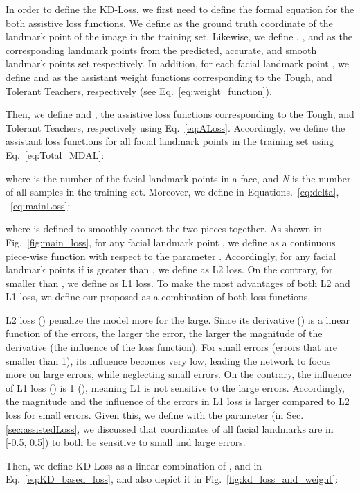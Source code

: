 \documentclass[times,twocolumn,final,authoryear]{elsarticle}
\begin{document}
In order to define the KD-Loss, we first need to define the formal equation for the both assistive loss functions. We define  as the ground truth coordinate of the  landmark point of the  image in the training set. Likewise, we define , , and  as the corresponding landmark points from the predicted, accurate, and smooth landmark points set respectively. In addition, for each facial landmark point , we define  and  as the assistant weight functions corresponding to the Tough, and Tolerant Teachers, respectively (see Eq.~\ref{eq:weight_function}).

Then, we define  and , the assistive loss functions corresponding to the Tough, and Tolerant Teachers, respectively using Eq.~\ref{eq:ALoss}. Accordingly, we define the assistant loss functions for all facial landmark points in the training set using Eq.~\ref{eq:Total_MDAL}:

where  is the number of the facial landmark points in a face, and \textit{N} is the number of all samples in the training set. Moreover, we define  in Equations.~\ref{eq:delta}, ~\ref{eq:mainLoss}:



where  is defined to smoothly connect the two pieces together. As shown in Fig.~\ref{fig:main_loss}, for any facial landmark point , we define  as a continuous piece-wise function with respect to the parameter . Accordingly, for any facial landmark points if  is greater than , we define  as L2 loss. On the contrary, for  smaller than , we define  as L1 loss. To make the most advantages of both L2 and L1 loss, we define our proposed  as a combination of both loss functions.

L2 loss () penalize the model more for the large. Since its derivative () is a linear function of the errors, the larger the error, the larger the magnitude of the derivative (the influence of the loss function). For small errors (errors that are smaller than 1), its influence becomes very low, leading the network to focus more on large errors, while neglecting small errors.
On the contrary, the influence of L1 loss () is 1 (), meaning L1 is not sensitive to the large errors. Accordingly, the magnitude and the influence of the errors in L1 loss is larger compared to L2 loss for small errors. Given this, we define  with the parameter  (in Sec.\ref{sec:assistedLoss}, we discussed that coordinates of all facial landmarks are in [-0.5, 0.5]) to both be sensitive to small and large errors.

Then, we define KD-Loss as a linear combination of ,  and  in Eq.~\ref{eq:KD_based_loss}, and also depict it in Fig.~\ref{fig:kd_loss_and_weight}:
\end{document}
